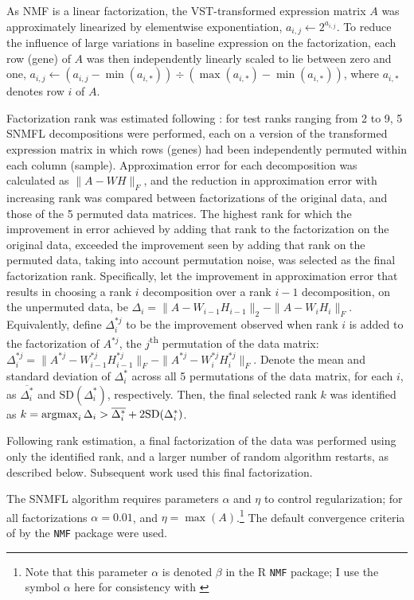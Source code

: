 \documentclass[dissertation.tex]{subfiles}
\begin{document}
As \gls{NMF} is a linear factorization, the \gls{VST}-transformed expression matrix $A$ was approximately linearized by elementwise exponentiation, $a_{i,j} \leftarrow 2^{a_{i,j}}$.  To reduce the influence of large variations in baseline expression on the factorization, each row (gene) of $A$ was then independently linearly scaled to lie between zero and one, $a_{i,j} \leftarrow (a_{i,j} - \min(a_{i,*})) \div (\max(a_{i,*}) - \min(a_{i,*}))$, where $a_{i,*}$ denotes row $i$ of $A$.

Factorization rank was estimated following \cite{Frigyesi2008}: for test ranks ranging from 2 to 9, 5 \gls{SNMFL} decompositions were performed, each on a version of the transformed expression matrix in which rows (genes) had been independently permuted within each column (sample).  Approximation error for each decomposition was calculated as $\|A - W H\|_F$, and the reduction in approximation error with increasing rank was compared between factorizations of the original data, and those of the 5 permuted data matrices.  The highest rank for which the improvement in error achieved by adding that rank to the factorization on the original data, exceeded the improvement seen by adding that rank on the permuted data, taking into account permutation noise, was selected as the final factorization rank.  Specifically, let the improvement in approximation error that results in choosing a rank $i$ decomposition over a rank $i-1$ decomposition, on the unpermuted data, be $\Delta_i = \|A - W_{i-1} H_{i-1}\|_2 - \|A - W_{i} H_{i}\|_F$.  Equivalently, define $\Delta^{*j}_i$ to be the improvement observed when rank $i$ is added to the factorization of $A^{*j}$, the $j$\textsuperscript{th} permutation of the data matrix: $\Delta^{*j}_i = \|A^{*j} - W^{*j}_{i-1} H^{*j}_{i-1}\|_F - \|A^{*j} - W^{*j}_{i} H^{*j}_{i}\|_F$.  Denote the mean and standard deviation of $\Delta^{*}_i$ across all 5 permutations of the data matrix, for each $i$, as $\overline{\Delta^{*}_i}$ and $\text{SD}(\Delta^{*}_i)$, respectively.  Then, the final selected rank $k$ was identified as $k = \operatorname*{\arg\!\max}_i \Delta_i > \overline{\Delta^{*}_i} + 2 \text{SD}(\Delta^{*}_i)$.

Following rank estimation, a final factorization of the data was performed using only the identified rank, and a larger number of random algorithm restarts, as described below.  Subsequent work used this final factorization.

The \gls{SNMFL} algorithm requires parameters $\alpha$ and $\eta$ to control regularization; for all factorizations $\alpha = 0.01$, and $\eta = \max(A)$.\footnote{Note that this parameter $\alpha$ is denoted $\beta$ in the R \texttt{NMF} package; I use the symbol $\alpha$ here for consistency with \cite{Kim2007}}  The default convergence criteria of by the \texttt{NMF} package were used.
\end{document}
